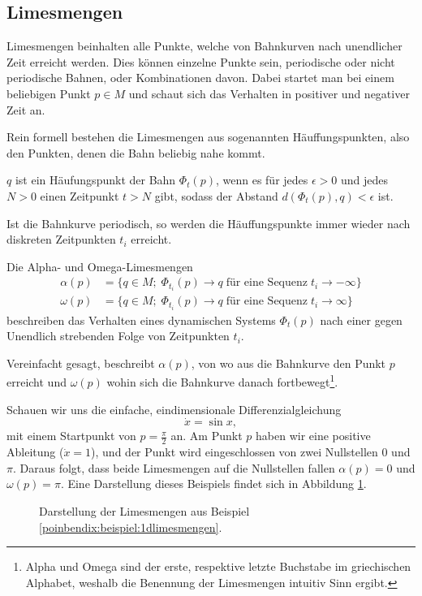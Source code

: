\subsection{Limesmengen} \label{poinbendix:subsection:limesmengen}

Limesmengen beinhalten alle Punkte, welche von Bahnkurven nach unendlicher Zeit erreicht werden.
Dies können einzelne Punkte sein, periodische oder nicht periodische Bahnen, oder Kombinationen davon.
Dabei startet man bei einem beliebigen Punkt $p \in M$ und schaut sich das Verhalten in positiver und negativer Zeit an.

Rein formell bestehen die Limesmengen aus sogenannten Häuffungspunkten, also den Punkten, denen die Bahn beliebig nahe kommt.
\begin{definition}[Häuffungspunkte]
\label{poinbendix:def:limesmengen}
$q$ ist ein Häufungspunkt der Bahn $\Phi_t(p)$, wenn es für jedes $\epsilon > 0$ und jedes $N > 0$ einen Zeitpunkt $t > N$ gibt, sodass der Abstand $d(\Phi_t(p),q) < \epsilon$ ist.
\end{definition}

Ist die Bahnkurve periodisch, so werden die Häuffungspunkte immer wieder nach diskreten Zeitpunkten $t_i$ erreicht.
\begin{definition}[Limesmengen]
\label{poinbendix:def:limesmengen}
Die Alpha- und Omega-Limesmengen
\begin{align*}
    \alpha(p) &= \{q\in M; \; \Phi_{t_i}(p) \to q \; \text{für eine Sequenz} \; t_i \to -\infty\} \\
    \omega(p) &= \{q\in M; \; \Phi_{t_i}(p) \to q \; \text{für eine Sequenz} \; t_i \to \infty\}
\end{align*}
beschreiben das Verhalten eines dynamischen Systems $\Phi_t(p)$ nach einer gegen Unendlich strebenden Folge von Zeitpunkten $t_i$.
\end{definition}

Vereinfacht gesagt, beschreibt $\alpha(p)$, von wo aus die Bahnkurve den Punkt $p$ erreicht und $\omega(p)$ wohin sich die Bahnkurve danach fortbewegt\footnote{Alpha und Omega sind der erste, respektive letzte Buchstabe im griechischen Alphabet, weshalb die Benennung der Limesmengen intuitiv Sinn ergibt.}.

\begin{beispiel} \label{poinbendix:beispiel:1dlimesmengen}
Schauen wir uns die einfache, eindimensionale Differenzialgleichung
\begin{equation*}
    \dot{x} = \sin x,
\end{equation*}
mit einem Startpunkt von $p = \frac{\pi}{2}$ an.
Am Punkt $p$ haben wir eine positive Ableitung ($\dot{x} = 1$), und der Punkt wird eingeschlossen von zwei Nullstellen $0$ und $\pi$.
Daraus folgt, dass beide Limesmengen auf die Nullstellen fallen $\alpha(p) = 0$ und $\omega(p) = \pi$.
Eine Darstellung dieses Beispiels findet sich in Abbildung \ref{poinbendix:fig:limesmenge}.
\begin{figure}
    \centering
    
    \caption{Darstellung der Limesmengen aus Beispiel \ref{poinbendix:beispiel:1dlimesmengen}.}
    \label{poinbendix:fig:limesmenge}
\end{figure}
\end{beispiel}

